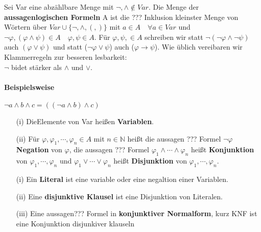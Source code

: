     Sei Var eine abzählbare Menge mit \(\lnot, \wedge \not \in Var\). Die Menge der \textbf{aussagenlogischen Formeln} A ist die ??? Inklusion kleinster Menge von Wörtern über \(Var \cup \{\lnot, \wedge, (,)\}\) mit \(a \in A \quad \forall a \in Var\) und \(\lnot \varphi, (\varphi \wedge \psi) \in A \quad \varphi, \psi \in A\). Für \(\varphi, \psi, \in A\) schreiben wir statt \(\lnot(\lnot \varphi \wedge \lnot \psi)\) auch \((\varphi \vee \psi)\) und statt (\(\lnot \varphi \vee \psi\)) auch (\(\varphi \to \psi\)). Wie üblich vereibaren wir Klammerregeln zur besseren lesbarkeit: \\ \(\lnot\) bidet stärker als \(\wedge\) und \(\vee\). 
    \paragraph*{Beispielsweise}
        \(\lnot a \wedge b \wedge c = ((\lnot a \wedge b)\wedge c)\)
    
    \begin{itemize}
        \item [(i)]DieElemente von Var heißen \textbf{Variablen}.
        \item [(ii)] Für \(\varphi, \varphi_1, \cdots, \varphi_n \in A\) mit \(n \in \mathbb{N}\) heißt die aussagen ??? Formel \( \lnot \varphi\) \textbf{Negation} von \(\varphi\), die aussagen ??? Formel \(\varphi_1 \wedge \cdots \wedge \varphi_n\) heißt \textbf{Konjunktion} von \(\varphi_1, \cdots, \varphi_n\) und \(\varphi_1 \vee \cdots \vee \varphi_n\) heißt \textbf{Disjunktion} von \(\varphi_1, \cdots, \varphi_n\).
    \end{itemize}

\begin{itemize}
    \item [(i)] Ein \textbf{Literal} ist eine variable oder eine negaltion einer Variablen.
    \item [(ii)] Eine \textbf{disjunktive Klausel} ist eine Disjunktion von Literalen.
    \item [(iii)] Eine aussagen??? Formel in \textbf{konjunktiver Normalform}, kurz KNF ist eine Konjunktion disjunkiver klauseln
\end{itemize}


